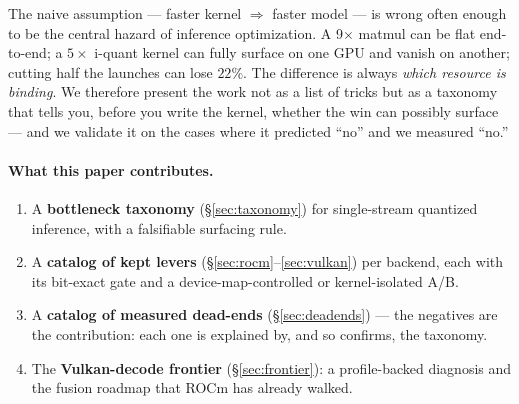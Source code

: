 \documentclass[11pt]{article}
\newcommand{\x}{\ensuremath{\times}}
\begin{document}
The naive assumption --- faster kernel $\Rightarrow$ faster model --- is wrong often enough to be
the central hazard of inference optimization. A 9\x{} matmul can be flat end-to-end; a $5\x$ i-quant
kernel can fully surface on one GPU and vanish on another; cutting half the launches can lose
$22\%$. The difference is always \emph{which resource is binding}. We therefore present the work
not as a list of tricks but as a taxonomy that tells you, before you write the kernel, whether the
win can possibly surface --- and we validate it on the cases where it predicted ``no'' and we
measured ``no.''

\paragraph{What this paper contributes.}
\begin{enumerate}[noitemsep]
  \item A \textbf{bottleneck taxonomy} (\S\ref{sec:taxonomy}) for single-stream quantized
        inference, with a falsifiable surfacing rule.
  \item A \textbf{catalog of kept levers} (\S\ref{sec:rocm}--\ref{sec:vulkan}) per backend, each
        with its bit-exact gate and a device-map-controlled or kernel-isolated A/B.
  \item A \textbf{catalog of measured dead-ends} (\S\ref{sec:deadends}) --- the negatives are the
        contribution: each one is explained by, and so confirms, the taxonomy.
  \item The \textbf{Vulkan-decode frontier} (\S\ref{sec:frontier}): a profile-backed diagnosis and
        the fusion roadmap that ROCm has already walked.
\end{enumerate}
\end{document}
